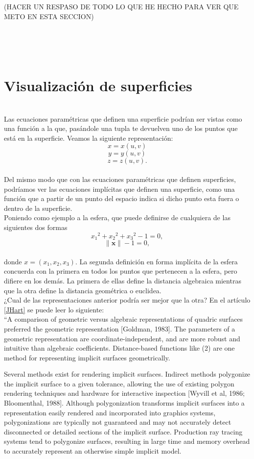 \begin{definicion}
(HACER UN RESPASO DE TODO LO QUE HE HECHO PARA VER QUE METO EN ESTA SECCION)


${ }$\\
${ }$\\
${ }$\\
\section{Visualización de superficies}
${ }$\\

Las ecuaciones paramétricas que definen una superficie podrían ser vistas como una función a la que, pasándole una tupla te devuelven uno de los puntos que está en la superficie. Veamos la siguiente representación:
${ }$\\
$$ x = x(u,v) $$
$$ y = y(u,v) $$
$$ z = z(u,v). $$
${ }$\\
Del mismo modo que con las ecuaciones paramétricas que definen superficies, podríamos ver las ecuaciones implícitas que definen una superficie, como una función que a partir de un punto del espacio indica si dicho punto esta fuera o dentro de la superficie.
${ }$\\

Poniendo como ejemplo a la esfera, que puede definirse de cualquiera de las siguientes dos formas
${ }$\\
$$ {x_1}^2 + {x_2}^2 + {x_3}^2 -1 = 0, $$
$$ \lVert \mathbf{x} \rVert -1 = 0, $$
${ }$\\
donde $x = (x_1, x_2, x_3)$. La segunda definición en forma implícita de la esfera concuerda con la primera en todos los puntos que pertenecen a la esfera, pero difiere en los demás. La primera de ellas define la distancia algebraica mientras que la otra define la distancia geométrica o euclidea.
${ }$\\

¿Cual de las representaciones anterior podría ser mejor que la otra? En el artículo \ref{JHart} se puede leer lo siguiente:
${ }$\\

``A comparison of geometric versus algebraic representations of quadric surfaces preferred the geometric representation [Goldman, 1983]. The parameters of a geometric representation are coordinate-independent, and are more robust and intuitive than algebraic coefficients. Distance-based functions like (2) are one method for representing implicit surfaces geometrically.

Several methods exist for rendering implicit surfaces. Indirect methods polygonize the implicit surface to a given tolerance, allowing the use of existing polygon rendering techniques and hardware for interactive inspection [Wyvill et al, 1986; Bloomenthal, 1988]. Although polygonization transforms implicit surfaces into a representation easily rendered and incorporated into graphics systems, polygonizations are typically not guaranteed and may not accurately detect disconnected or detailed sections of the implicit surface. Production ray tracing systems tend to polygonize surfaces, resulting in large time and memory overhead to accurately represent an otherwise simple implicit model.


\end{definicion}

